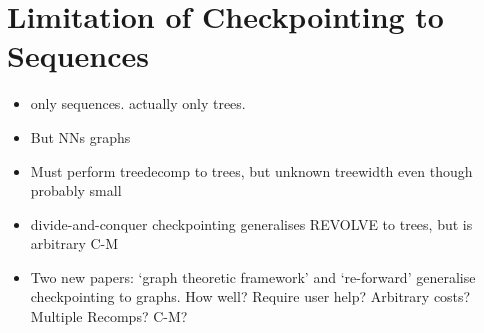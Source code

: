 \section{Limitation of Checkpointing to Sequences} \label{sec:5-qual-eval-seq-only}
\begin{itemize}[topsep=0.2em]
    \item only sequences. actually only trees.
    \item But NNs graphs
    \item Must perform treedecomp to trees, but unknown treewidth even though probably small
    \item divide-and-conquer checkpointing generalises REVOLVE to trees, but is arbitrary C-M
    \item Two new papers: `graph theoretic framework' and `re-forward' generalise checkpointing to graphs. How well? Require user help? Arbitrary costs? Multiple Recomps? C-M?
\end{itemize}